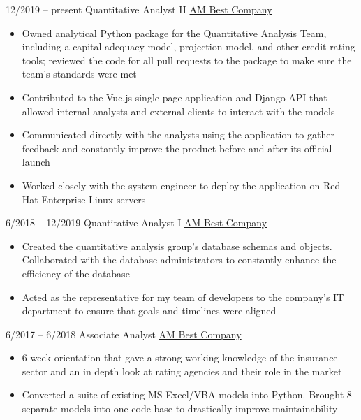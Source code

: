 \documentclass[9pt]{developercv} %
\begin{document}
\begin{entrylist}
	\vspace{-14pt}
	\entry
		{\small12/2019 -- present}
		{Quantitative Analyst II}
		{\href{http://www.ambest.com/home/default.aspx}{AM Best Company}}
		{\vspace{-18pt}
			\begin{itemize}[leftmargin=*]
				\setlength{\itemsep}{0pt}
				\setlength{\parskip}{0pt}
				\setlength{\parsep}{0pt}
				\item Owned analytical Python package for the Quantitative Analysis Team, including a capital adequacy model, projection model, and other credit rating tools; reviewed the code for all pull requests to the package to make sure the team's standards were met
				\item Contributed to the Vue.js single page application and Django API that allowed internal analysts and external clients to interact with the models
				\item Communicated directly with the analysts using the application to gather feedback and constantly improve the product before and after its official launch
				\item Worked closely with the system engineer to deploy the application on Red Hat Enterprise Linux servers
		\end{itemize}
	\vspace{10pt}}
	\entry
		{\small6/2018 -- 12/2019}
		{Quantitative Analyst I}
		{\href{http://www.ambest.com/home/default.aspx}{AM Best Company}}
		{\vspace{-18pt}
		\begin{itemize}[leftmargin=*]
				\setlength{\itemsep}{0pt}
				\setlength{\parskip}{0pt}
				\setlength{\parsep}{0pt}
				\item Created the quantitative analysis group's database schemas and objects. Collaborated with the database administrators to constantly enhance the efficiency of the database
				\item Acted as the representative for my team of developers to the company's IT department to ensure that goals and timelines were aligned
		\end{itemize}
	\vspace{-5pt}}
	\entry
		{\small6/2017 -- 6/2018}
		{Associate Analyst}
		{\href{http://www.ambest.com/home/default.aspx}{AM Best Company}}
		{\vspace{-18pt}
			\begin{itemize}[leftmargin=*]
				\setlength{\itemsep}{0pt}
				\setlength{\parskip}{0pt}
				\setlength{\parsep}{0pt}
				\item 6 week orientation that gave a strong working knowledge of the insurance sector and an in depth look at rating agencies and their role in the market
				\item Converted a suite of existing MS Excel/VBA models into Python. Brought 8 separate models into one code base to drastically improve maintainability
		\end{itemize}}
\end{entrylist}
\end{document}
